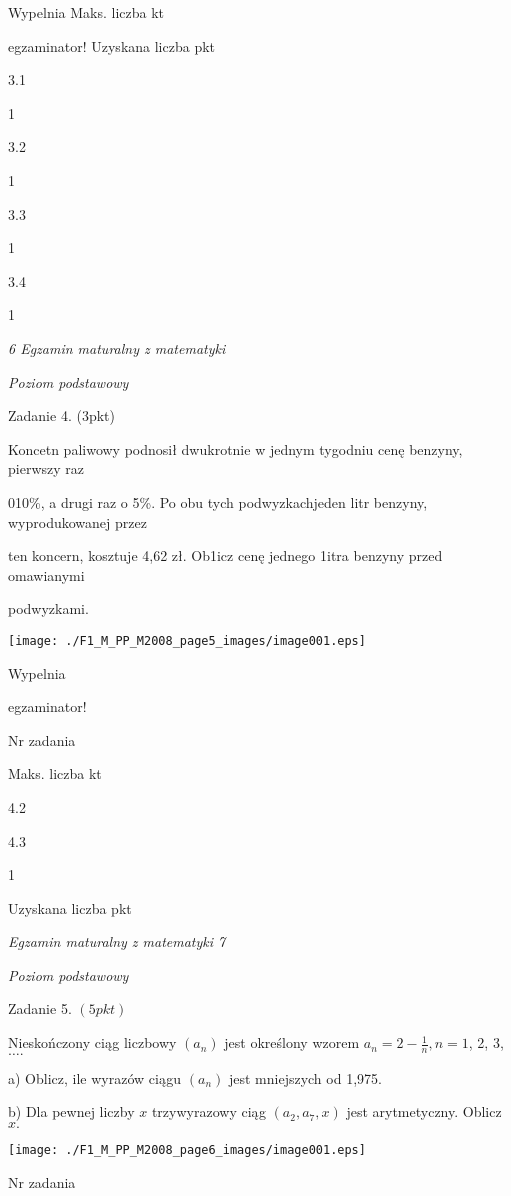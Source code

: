 \documentclass[a4paper,12pt]{article}
\begin{document}
Wypelnia Maks. liczba kt

egzaminator! Uzyskana liczba pkt

3.1

1

3.2

1

3.3

1

3.4

1





{\it 6 Egzamin maturalny z matematyki}

{\it Poziom podstawowy}

Zadanie 4. (3pkt)

Koncetn paliwowy podnosił dwukrotnie w jednym tygodniu cenę benzyny, pierwszy raz

010\%, a drugi raz o 5\%. Po obu tych podwyzkachjeden litr benzyny, wyprodukowanej przez

ten koncern, kosztuje 4,62 zł. Ob1icz cenę jednego 1itra benzyny przed omawianymi

podwyzkami.
\begin{center}
\texttt{[image: ./F1\_M\_PP\_M2008\_page5\_images/image001.eps]}
\end{center}
Wypelnia

egzaminator!

Nr zadania

Maks. liczba kt

4.2

4.3

1

Uzyskana liczba pkt





{\it Egzamin maturalny z matematyki 7}

{\it Poziom podstawowy}

Zadanie 5. $(5pkt)$

Nieskończony ciąg liczbowy $(a_{n})$ jest określony wzorem $a_{n}=2-\displaystyle \frac{1}{n}, n=1$, 2, 3,$\ldots.$

a) Oblicz, ile wyrazów ciągu $(a_{n})$ jest mniejszych od 1,975.

b) Dla pewnej liczby $x$ trzywyrazowy ciąg $(a_{2},a_{7},x)$ jest arytmetyczny. Oblicz $x.$
\begin{center}
\texttt{[image: ./F1\_M\_PP\_M2008\_page6\_images/image001.eps]}
\end{center}
Nr zadania
\end{document}
